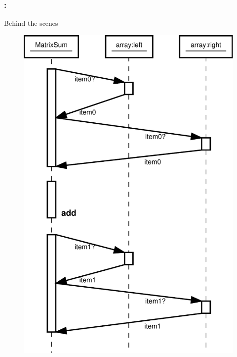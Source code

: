 \documentclass[9pt,xcolor=table]{beamer}
\begin{document}
\begin{frame}
\frametitle{\insertsectionhead{}: \insertsubsectionhead{}}
\begin{block}{Behind the scenes}
  \begin{figure}[htb]
    \includegraphics[height=0.7\textheight]{img/ArrayFetchSequential}
  \end{figure}
\end{block}
\end{frame}
\end{document}
